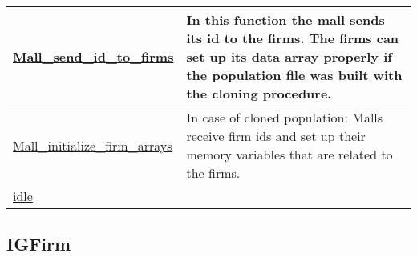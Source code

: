 \documentclass[a4paper,11pt]{article}
\begin{document}
\begin{longtable}[H!]{ll}
\midrule
\parbox{5cm}{\url{Mall_send_id_to_firms}}  & \parbox{10cm}{In this function the mall sends its id to the firms. The firms can set up its data array properly if the population file was built with the cloning procedure. } \\
\midrule
\parbox{5cm}{\url{Mall_initialize_firm_arrays}}  & \parbox{10cm}{In case of cloned population: Malls receive firm ids and set up their memory variables that are related to the firms.} \\
\midrule
\parbox{5cm}{\url{idle}}  & \parbox{10cm}{} \\
\end{longtable}

\subsection{IGFirm}
\end{document}
